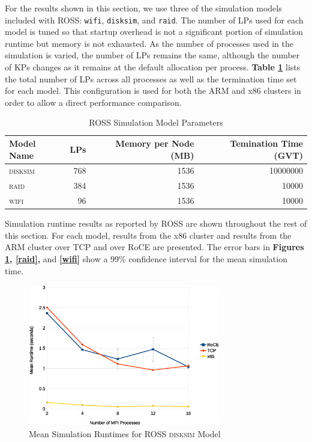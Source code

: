 \documentclass[11pt]{book}
\begin{document}
For the results shown in this section, we use three of the simulation models
included with ROSS: \verb;wifi;, \verb;disksim;, and \verb;raid;. The number of
LPs used for each model is tuned so that startup overhead is not a significant
portion of simulation runtime but memory is not exhausted. As the number of
processes used in the simulation is varied, the number of LPs remains the same,
although the number of KPs changes as it remains at the default allocation per
process. \textbf{Table \ref{lptable}} lists the total number of LPs across all
processes as well as the termination time set for each model. This configuration
is used for both the ARM and x86 clusters in order to allow a direct performance
comparison.

\begin{table}
  \caption{ROSS Simulation Model Parameters}
  \label{lptable}
  \centering
  \begin{tabular}[c]{| l | r | r | r |}
    \hline
    Model Name & LPs & Memory per Node (MB) & Temination Time (GVT) \\ \hline
    \textsc{disksim} & 768 & 1536 & 10000000 \\
    \textsc{raid} & 384 & 1536 & 10000 \\
    \textsc{wifi} & 96 & 1536 & 10000 \\
    \hline
  \end{tabular}
\end{table}

Simulation runtime results as reported by ROSS are shown throughout the rest of
this section. For each model, results from the x86 cluster and results from the
ARM cluster over TCP and over RoCE are presented. The error bars in
\textbf{Figures \ref{disksim}, \ref{raid},} and \textbf{\ref{wifi}} show a 99\%
confidence interval for the mean simulation time.

\begin{figure}
\centering
\includegraphics[width=0.75\textwidth]{disksim}
\caption{Mean Simulation Runtimes for ROSS \textsc{disksim} Model}
\label{disksim}
\end{figure}
\end{document}
